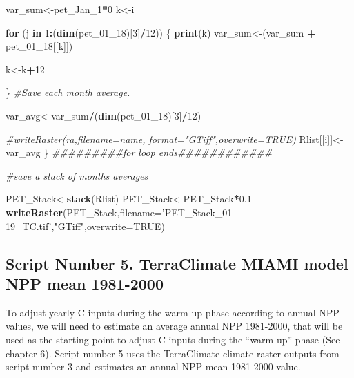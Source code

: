 \documentclass[
  10pt,
  b5paper,
]{book}
\newenvironment{Shaded}{\begin{snugshade}}{\end{snugshade}}
\newcommand{\CommentTok}[1]{\textcolor[rgb]{0.56,0.35,0.01}{\textit{#1}}}
\newcommand{\ControlFlowTok}[1]{\textcolor[rgb]{0.13,0.29,0.53}{\textbf{#1}}}
\newcommand{\DataTypeTok}[1]{\textcolor[rgb]{0.13,0.29,0.53}{#1}}
\newcommand{\DecValTok}[1]{\textcolor[rgb]{0.00,0.00,0.81}{#1}}
\newcommand{\FloatTok}[1]{\textcolor[rgb]{0.00,0.00,0.81}{#1}}
\newcommand{\KeywordTok}[1]{\textcolor[rgb]{0.13,0.29,0.53}{\textbf{#1}}}
\newcommand{\NormalTok}[1]{#1}
\newcommand{\OperatorTok}[1]{\textcolor[rgb]{0.81,0.36,0.00}{\textbf{#1}}}
\newcommand{\OtherTok}[1]{\textcolor[rgb]{0.56,0.35,0.01}{#1}}
\newcommand{\StringTok}[1]{\textcolor[rgb]{0.31,0.60,0.02}{#1}}
\begin{document}
\begin{Shaded}
\begin{Highlighting}[]
\NormalTok{var_sum<-pet_Jan_}\DecValTok{1}\OperatorTok{*}\DecValTok{0}
\NormalTok{k<-i}

\ControlFlowTok{for}\NormalTok{ (j }\ControlFlowTok{in} \DecValTok{1}\OperatorTok{:}\NormalTok{(}\KeywordTok{dim}\NormalTok{(pet_}\DecValTok{01}\NormalTok{_}\DecValTok{18}\NormalTok{)[}\DecValTok{3}\NormalTok{]}\OperatorTok{/}\DecValTok{12}\NormalTok{)) \{}
\KeywordTok{print}\NormalTok{(k)}
\NormalTok{var_sum<-(var_sum }\OperatorTok{+}\StringTok{ }\NormalTok{pet_}\DecValTok{01}\NormalTok{_}\DecValTok{18}\NormalTok{[[k]])}

\NormalTok{k<-k}\OperatorTok{+}\DecValTok{12}

\NormalTok{\}}
\CommentTok{#Save each month average. }

\NormalTok{var_avg<-var_sum}\OperatorTok{/}\NormalTok{(}\KeywordTok{dim}\NormalTok{(pet_}\DecValTok{01}\NormalTok{_}\DecValTok{18}\NormalTok{)[}\DecValTok{3}\NormalTok{]}\OperatorTok{/}\DecValTok{12}\NormalTok{)}

\CommentTok{#writeRaster(ra,filename=name, format="GTiff",overwrite=TRUE)}
\NormalTok{Rlist[[i]]<-var_avg}
\NormalTok{\}}
\CommentTok{#########for loop ends############}

\CommentTok{#save a stack of months averages}

\NormalTok{PET_Stack<-}\KeywordTok{stack}\NormalTok{(Rlist)}
\NormalTok{PET_Stack<-PET_Stack}\OperatorTok{*}\FloatTok{0.1}
\KeywordTok{writeRaster}\NormalTok{(PET_Stack,}\DataTypeTok{filename=}\StringTok{'PET_Stack_01-19_TC.tif'}\NormalTok{,}\StringTok{"GTiff"}\NormalTok{,}\DataTypeTok{overwrite=}\OtherTok{TRUE}\NormalTok{)}
\end{Highlighting}
\end{Shaded}

\hypertarget{script-number-5.-terraclimate-miami-model-npp-mean-1981-2000}{%
\subsection{Script Number 5. TerraClimate MIAMI model NPP mean 1981-2000}\label{script-number-5.-terraclimate-miami-model-npp-mean-1981-2000}}

To adjust yearly C inputs during the warm up phase according to annual NPP values, we will need to estimate an average annual NPP 1981-2000, that will be used as the starting point to adjust C inputs during the ``warm up'' phase (See chapter 6). Script number 5 uses the TerraClimate climate raster outputs from script number 3 and estimates an annual NPP mean 1981-2000 value.
\end{document}
